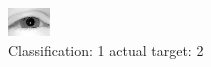 \begin{figure}[h!]
\begin{center}
\includegraphics[width=0.60\columnwidth]{figures/ID2268_class_1_target_2.png}
\end{center}
\caption{ Classification: 1 actual target: 2}
\label{fig:ID2268_class_1_target_2}
\end{figure}

